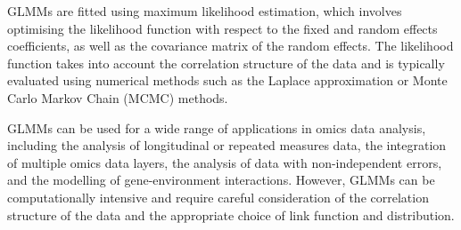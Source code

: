 \documentclass[
]{book}
\begin{document}
GLMMs are fitted using maximum likelihood estimation, which involves optimising the likelihood function with respect to the fixed and random effects coefficients, as well as the covariance matrix of the random effects. The likelihood function takes into account the correlation structure of the data and is typically evaluated using numerical methods such as the Laplace approximation or Monte Carlo Markov Chain (MCMC) methods.

GLMMs can be used for a wide range of applications in omics data analysis, including the analysis of longitudinal or repeated measures data, the integration of multiple omics data layers, the analysis of data with non-independent errors, and the modelling of gene-environment interactions. However, GLMMs can be computationally intensive and require careful consideration of the correlation structure of the data and the appropriate choice of link function and distribution.
\end{document}
